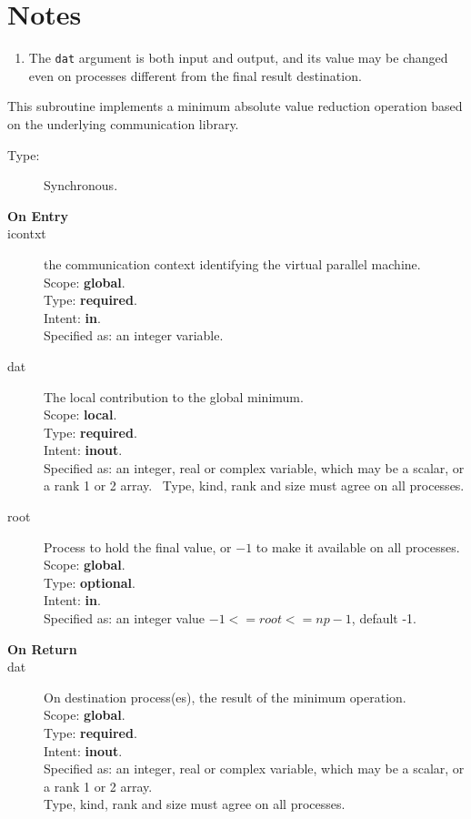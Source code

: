 \section*{Notes}
\begin{enumerate}
\item The \verb|dat| argument is both input and output, and its
  value may be changed even on processes different from the final
  result destination.
\end{enumerate}



This subroutine implements a minimum absolute value reduction
operation based on the underlying communication library. 
\begin{description}
\item[Type:] Synchronous.
\item[\bf  On Entry ]
\item[icontxt] the communication context identifying the virtual
  parallel machine.\\
Scope: {\bf global}.\\
Type: {\bf required}.\\
Intent: {\bf in}.\\
Specified as: an integer variable.
\item[dat] The local contribution to the global minimum.\\
Scope: {\bf local}.\\
Type: {\bf required}.\\
Intent: {\bf inout}.\\
Specified as: an integer, real or complex variable, which may be a
scalar, or a rank 1 or 2 array. \
Type, kind, rank and size must agree on all processes.
\item[root] Process to hold the final value, or $-1$ to make it available
  on all processes.\\
Scope: {\bf global}.\\
Type: {\bf optional}.\\
Intent: {\bf in}.\\
Specified as: an integer value $-1<= root <= np-1$, default -1. \\
\end{description}


\begin{description}
\item[\bf On Return]
\item[dat] On destination process(es), the result of the minimum operation.\\
Scope: {\bf global}.\\
Type: {\bf required}.\\
Intent: {\bf inout}.\\
Specified as: an integer, real or complex variable, which may be a
scalar, or a rank 1 or 2 array. \\
Type, kind, rank and size must agree on all processes.
\end{description}


